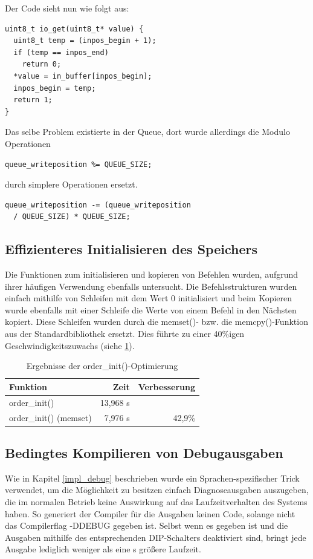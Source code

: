 Der Code sieht nun wie folgt aus:
\begin{verbatim}
uint8_t io_get(uint8_t* value) {
  uint8_t temp = (inpos_begin + 1);
  if (temp == inpos_end)
    return 0;
  *value = in_buffer[inpos_begin];
  inpos_begin = temp;
  return 1;
}
\end{verbatim}
Das selbe Problem existierte in der Queue, dort wurde allerdings die Modulo Operationen
\begin{verbatim}
queue_writeposition %= QUEUE_SIZE;
\end{verbatim}
durch simplere Operationen ersetzt.
\begin{verbatim}
queue_writeposition -= (queue_writeposition
  / QUEUE_SIZE) * QUEUE_SIZE;
\end{verbatim}
\subsection{Effizienteres Initialisieren des Speichers}
Die Funktionen zum initialisieren und kopieren von Befehlen wurden, aufgrund ihrer häufigen Verwendung ebenfalls
untersucht. Die Befehlsstrukturen wurden einfach mithilfe von Schleifen mit dem Wert 0 initialisiert und beim
Kopieren wurde ebenfalls mit einer Schleife die Werte von einem Befehl in den Nächsten kopiert. Diese Schleifen
wurden durch die memset()- bzw. die memcpy()-Funktion aus der Standardbibliothek ersetzt. Dies führte zu einer
40\%igen Geschwindigkeitszuwachs (siehe \ref{order_init_meas}).
\begin{table}[htb]
\begin{center}
	\begin{tabular}{|l||r|r|}
		\hline
		\textbf{Funktion} & \textbf{Zeit} & \textbf{Verbesserung} \\ \hline \hline
		order\_init() & 13,968 \textmu{}s & \\ \hline
		order\_init() (memset) & 7,976 \textmu{}s & 42,9\% \\ \hline
	\end{tabular}
	\caption{\label{order_init_meas} Ergebnisse der order\_init()-Optimierung}
\end{center}
\end{table}
\subsection{Bedingtes Kompilieren von Debugausgaben}
Wie in Kapitel \ref{impl_debug} beschrieben wurde ein Sprachen-spezifischer Trick verwendet, um 
die Möglichkeit zu besitzen einfach Diagnoseausgaben auszugeben, die im normalen Betrieb keine Auswirkung
auf das Laufzeitverhalten des Systems haben. So generiert der Compiler für die Ausgaben keinen Code, solange nicht
das Compilerflag -DDEBUG gegeben ist. Selbst wenn es gegeben ist und die Ausgaben mithilfe des entsprechenden DIP-Schalters
deaktiviert sind, bringt jede Ausgabe lediglich weniger als eine \textmu{}s größere Laufzeit.

